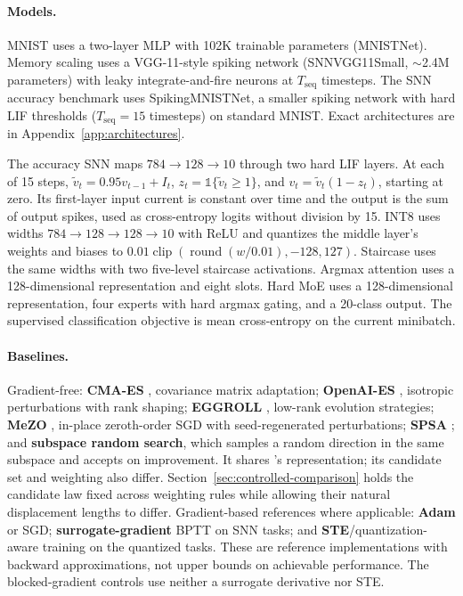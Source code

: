 \paragraph{Models.}
MNIST uses a two-layer MLP with 102K trainable parameters (MNISTNet).
Memory scaling uses a VGG-11-style spiking network (SNNVGG11Small, ${\sim}$2.4M parameters) with leaky integrate-and-fire neurons at $T_{\mathrm{seq}}$ timesteps.
The SNN accuracy benchmark uses SpikingMNISTNet, a smaller spiking network with hard LIF thresholds ($T_{\mathrm{seq}}{=}15$ timesteps) on standard MNIST.
Exact architectures are in Appendix~\ref{app:architectures}.

The accuracy SNN maps $784\to128\to10$ through two hard LIF layers.
At each of 15 steps, $\widetilde v_t=0.95v_{t-1}+I_t$,
$z_t=\mathbb{1}\{\widetilde v_t\geq1\}$, and
$v_t=\widetilde v_t(1-z_t)$, starting at zero. Its first-layer input current
is constant over time and the output is the sum of output spikes, used as
cross-entropy logits without division by 15. INT8 uses widths
$784\to128\to128\to10$ with ReLU and quantizes the middle layer's
weights and biases to $0.01\operatorname{clip}(\operatorname{round}(w/0.01),-128,127)$.
Staircase uses the same widths with two five-level staircase activations.
Argmax attention uses a 128-dimensional representation and eight slots.
Hard MoE uses a 128-dimensional representation, four experts with hard
argmax gating, and a 20-class output. The supervised classification objective
is mean cross-entropy on the current minibatch.

\paragraph{Baselines.}
Gradient-free:
\textbf{CMA-ES} \citep{hansen2016cma}, covariance matrix adaptation;
\textbf{OpenAI-ES} \citep{salimans2017evolution}, isotropic perturbations with
rank shaping;
\textbf{EGGROLL} \citep{sarkar2025eggroll}, low-rank evolution strategies;
\textbf{MeZO} \citep{malladi2023mezo}, in-place zeroth-order SGD with
seed-regenerated perturbations;
\textbf{SPSA} \citep{spall1992multivariate};
and \textbf{subspace random search}, which samples a random direction in the same
subspace and accepts on improvement. It shares \sysname{}'s representation;
its candidate set and weighting also differ. Section~\ref{sec:controlled-comparison}
holds the candidate law fixed across weighting rules while allowing their
natural displacement lengths to differ.
Gradient-based references where applicable: \textbf{Adam} \citep{kingma2015adam}
or SGD; \textbf{surrogate-gradient} BPTT \citep{neftci2019surrogate} on SNN tasks;
and \textbf{STE}/quantization-aware training \citep{bengio2013ste} on the
quantized tasks. These are reference implementations with backward approximations, not
upper bounds on achievable performance. The blocked-gradient controls use
neither a surrogate derivative nor STE.

